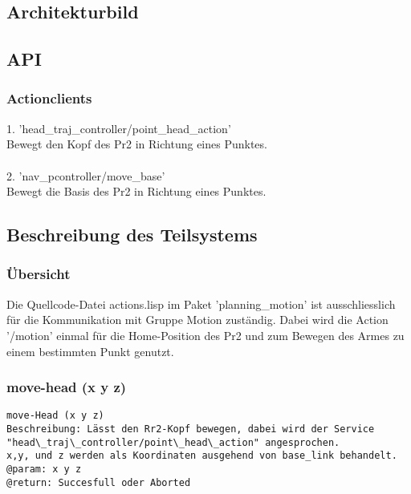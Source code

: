 \documentclass{suturo}
\begin{document}
\subsection{Architekturbild}


\begin{figure}[!htb]
\end{figure}


\subsection{API}
\subsubsection{Actionclients}
1. 'head\_traj\_controller/point\_head\_action' \\
Bewegt den Kopf des Pr2 in Richtung eines Punktes.\\ \\
2. 'nav\_pcontroller/move\_base' \\
Bewegt die Basis des Pr2 in Richtung eines Punktes.
\subsection{Beschreibung des Teilsystems}

\subsubsection{\"Ubersicht}
Die Quellcode-Datei actions.lisp im Paket 'planning\_motion'  ist ausschliesslich für die Kommunikation mit Gruppe Motion zuständig. Dabei wird die Action '/motion' einmal für die Home-Position des Pr2 und zum Bewegen des Armes zu einem bestimmten Punkt genutzt.



\subsubsection{move-head (x y z)}

\begin{verbatim}
move-Head (x y z)
Beschreibung: Lässt den Rr2-Kopf bewegen, dabei wird der Service 
"head\_traj\_controller/point\_head\_action" angesprochen.
x,y, und z werden als Koordinaten ausgehend von base_link behandelt.
@param: x y z
@return: Succesfull oder Aborted
\end{verbatim}
\end{document}
